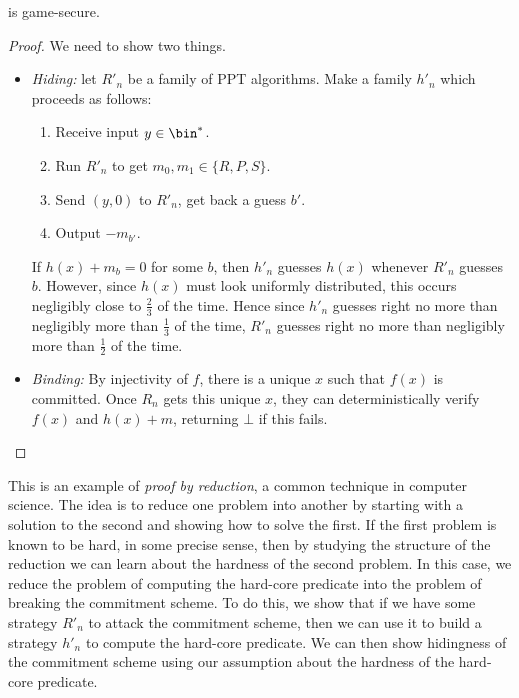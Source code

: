 \begin{prop}
	 is game-secure.
\end{prop}
\begin{proof}We need to show two things.
	\begin{itemize}
		\item \emph{Hiding:} let $R'_n$ be a family of PPT algorithms. Make a
		      family $h'_n$ which proceeds as follows:
		      \begin{enumerate}[itemsep=-0.2em]
			      \item Receive input $y\in\bin^*$.
			      \item Run $R'_n$ to get $m_0,m_1\in\{R,P,S\}$.
			      \item Send $(y, 0)$ to $R'_n$, get back a guess $b'$.
			      \item Output $-m_{b'}$.
		      \end{enumerate}

		      If $h(x) + m_b = 0$ for some $b$, then $h'_n$ guesses $h(x)$ whenever
		      $R'_n$ guesses $b$. However, since $h(x)$ must look uniformly
		      distributed, this occurs negligibly close to $\frac{2}{3}$ of the
		      time. Hence since $h'_n$ guesses right no more than negligibly more
		      than $\frac{1}{3}$ of the time, $R'_n$ guesses right no more than
		      negligibly more than $\frac{1}{2}$ of the time.
		\item \emph{Binding:} By injectivity of $f$, there is a unique $x$ such that
		      $f(x)$ is committed. Once $R_n$ gets this unique $x$, they can
		      deterministically verify $f(x)$ and $h(x)+m$, returning $\bot$ if this
		      fails. \qedhere
	\end{itemize}
\end{proof}

\noindent
This is an example of \emph{proof by reduction}, a common technique in computer
science. The idea is to reduce one problem into another by starting with a
solution to the second and showing how to solve the first. If the first problem
is known to be hard, in some precise sense, then by studying the structure of
the reduction we can learn about the hardness of the second problem. In this
case, we reduce the problem of computing the hard-core predicate into the
problem of breaking the commitment scheme. To do this, we show that if we have
some strategy $R'_n$ to attack the commitment scheme, then we can use it to
build a strategy $h'_n$ to compute the hard-core predicate. We can then show
hidingness of the commitment scheme using our assumption about the hardness of
the hard-core predicate.

